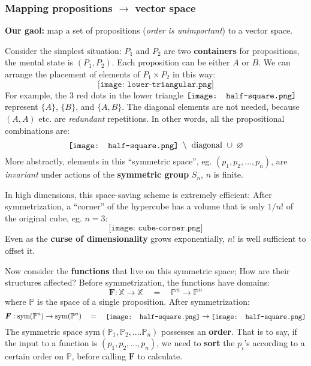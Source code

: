 \documentclass[orivec]{llncs}
\let\emptyset\varnothing			%
\newcommand{\vect}[1]{\boldsymbol{#1}}
\newcommand*\halfsquare{\raisebox{-.1\height}{\texttt{[image: half-square.png]}}}
\begin{document}
\subsubsection{Mapping propositions $\rightarrow$ vector space}

\textbf{Our gaol:} map a set of propositions (\textit{order is unimportant}) to a vector space.

Consider the simplest situation:  $P_1$ and $P_2$ are two \textbf{containers} for propositions, the mental state is $(P_1, P_2)$.  Each proposition can be either $A$ or $B$.  We can arrange the placement of elements of $P_1 \times P_2$ in this way:
\begin{equation}
\texttt{[image: lower-triangular.png]}
\end{equation}
For example, the 3 {\color{red}red} dots in the lower triangle $\halfsquare$ represent $\{ A \}$, $\{ B \}$, and $\{ A, B \}$.  The diagonal elements are not needed, because $(A, A)$ etc. are \textit{redundant} repetitions.  In other words, all the propositional combinations are:
\begin{equation}
\halfsquare \; \setminus \mbox{ diagonal } \cup \; \emptyset
\end{equation}
More abstractly, elements in this ``symmetric space'', eg. $(p_1, p_2, ..., p_n)$, are \textit{invariant} under actions of the \textbf{symmetric group} $S_n$, $n$ is finite.

In high dimensions, this space-saving scheme is extremely efficient:  After symmetrization, a ``corner'' of the hypercube has a volume that is only $1/n!$ of the original cube, eg. $n = 3$:
\begin{equation}
\texttt{[image: cube-corner.png]}
\end{equation}
Even as the \textbf{curse of dimensionality} grows exponentially, $n!$ is well sufficient to offset it.

Now consider the \textbf{functions} that live on this symmetric space;  How are their structures affected?  Before symmetrization, the functions have domains:
\begin{equation}
\vect{F}: \mathbb{X} \rightarrow \mathbb{X} \quad = \quad \mathbb{P}^n \rightarrow \mathbb{P}^n
\end{equation}
where $\mathbb{P}$ is the space of a single proposition.  After symmetrization:
\begin{equation}
\vect{F}: \mbox{sym}(\mathbb{P}^n) \rightarrow \mbox{sym}(\mathbb{P}^n) \quad = \quad \halfsquare \rightarrow \halfsquare
\end{equation}
The symmetric space $\mbox{sym}(\mathbb{P}_1, \mathbb{P}_2, .... \mathbb{P}_n)$ possesses an \textbf{order}.  That is to say, if the input to a function is $(p_1, p_2, ... , p_n)$, we need to \textbf{sort} the $p_i$'s according to a certain order on $\mathbb{P}$, before calling $\vect{F}$ to calculate.
\end{document}
